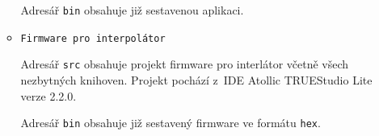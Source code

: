 \documentclass [a4paper,11pt,oneside,notitlepage,openright]{report} %
\begin{document}
\begin{appendix}
\begin{itemize}
\begin{itemize}
		Adresář {\tt bin} obsahuje již sestavenou aplikaci.
	
		
		\item {\tt Firmware pro interpolátor}
		
		Adresář {\tt src} obsahuje projekt firmware pro interlátor včetně všech nezbytných knihoven. Projekt pochází z~IDE Atollic TRUEStudio Lite verze 2.2.0.
		
		Adresář {\tt bin} obsahuje již sestavený firmware ve formátu {\tt hex}.
	\end{itemize}
\end{itemize}
\end{appendix}
\end{document}

